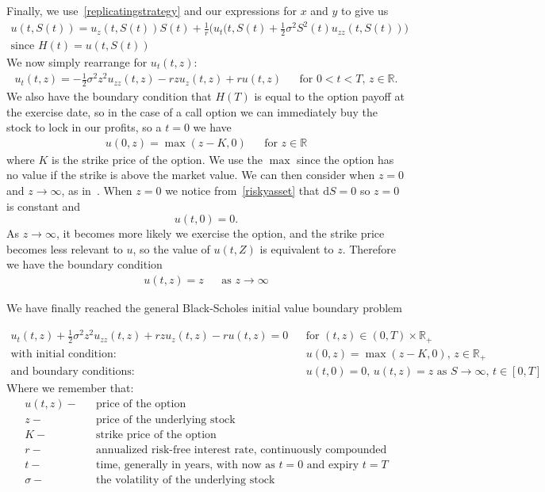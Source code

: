 \documentclass[11pt]{article} %
\begin{document}
Finally, we use~\eqref{replicatingstrategy} and our expressions for $x$ and $y$ to give us
\begin{align}
    u(t,S(t)) = u_z(t,S(t))S(t) + \frac{1}{r}\bigg(u_t(t,S(t) + \frac{1}{2}\sigma^2S^2(t)
    u_{zz}(t,S(t))\bigg) \\\text{since $H(t) = u(t,S(t))$}
\end{align}
We now simply rearrange for $u_t(t,z)$:
\begin{align}\label{blackscholes}
    u_t(t,z) = -\frac{1}{2}\sigma^2z^2u_{zz}(t,z) - rzu_z(t,z) + ru(t,z) 
   && \text{for $0<t<T$, $z \in \mathbb{R}$.}
\end{align}
We also have the boundary condition that $H(T)$ is equal to the option payoff at the exercise 
date, so in the case of a call option we can immediately buy the stock to lock in our profits, 
so a $t=0$ we have
\begin{align} \label{initialvalue}
    u(0,z) = \max{(z - K , 0)} && \text{for $z \in \mathbb{R}$}
\end{align}
where $K$ is the strike price of the option. We use the $\max$ since the option has no value 
if the strike is above the market value. We can then consider when $z=0$ and 
$z \to \infty$, as in~\cite{scholesapplication}. When $z=0$ we notice from~\eqref{riskyasset} 
that $\mathrm{d}S = 0$ so $z = 0$ is constant and
\begin{equation} \label{boundarycondition}
    u(t,0) = 0.
\end{equation}
As $z \to \infty$, it becomes more likely we exercise the option, and the strike price 
becomes less relevant to $u$, so the value of $u(t,Z)$ is equivalent to $z$. Therefore 
we have the boundary condition 
\begin{align} 
    u(t,z) = z && \text{as $z \to \infty$}
\end{align}

We have finally reached the general Black-Scholes initial value boundary problem

\begin{align}
    u_t(t,z) +\frac{1}{2}\sigma^2z^2u_{zz}(t,z) + rzu_z(t,z) - ru(t,z) = 0 &&
    \text{for $(t,z) \in (0,T) \times \mathbb{R}_+ $}\\
    \text{with initial condition: } && u(0,z) = \max{(z-K, 0)} \text{, } 
    z \in \mathbb{R}_+ \\
    \text{and boundary conditions: } && u(t, 0) = 0 \text{,  $u(t,z) = z$ as 
    $S \to \infty $,  $t \in [0,T]$}
\end{align}
Where we remember that: 
\begin{align}
    u(t,z) - && \text{price of the option}\\
    z - && \text{price of the underlying stock}\\
    K - && \text{strike price of the option}\\
    r - && \text{annualized risk-free interest rate, continuously compounded}\\
    t - && \text{time, generally in years, with now as $t=0$ and expiry $t=T$}\\
    \sigma - && \text{the volatility of the underlying stock}
\end{align}
\end{document}

